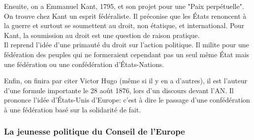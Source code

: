 \documentclass[10pt, a4paper, openany]{book}
\begin{document}
Ensuite, on a Emmanuel Kant, 1795, et son projet pour une "Paix perpétuelle". On trouve chez Kant un esprit fédéraliste. Il préconise que les États renoncent à la guerre et surtout se soumettent au droit, non étatique, et international. Pour Kant, la soumission au droit est une question de raison pratique. \\
Il reprend l'idée d'une primauté du droit sur l'action politique. Il milite pour une fédération des peuples qui ne formeraient cependant pas un seul même État mais une fédération ou une confédération d'États-Nations. 


Enfin, on finira par citer Victor Hugo (même si il y en a d'autres), il est l'auteur d'une formule importante le 28 août 1876, lors d'un discours devant l'AN. Il prononce l'idée d'États-Unis d'Europe: c'est à dire le passage d'une confédération à une fédération basé sur la solidarité de fait. 

\subsubsection{La jeunesse politique du Conseil de l'Europe}
\end{document}
